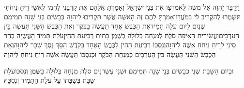\documentclass[../main/main.tex]{subfiles}
\begin{document}
\begin{multicols}{\ncols}
וַיְדַבֵּר יַהְוֶה אֶל מֹשֶׁה לֵּאמֹר\PreVerseSpace{}צַו אֶת בְּנֵי יִשְׂרָאֵל וְאָמַרְתָּ אֲלֵהֶם אֶת קָרְבָּנִי לַחְמִי לְאִשַּׁי רֵיחַ נִיחֹחִי תִּשְׁמְרוּ לְהַקְרִיב לִי בְּמֹעֲדָו\SubEnd{}\PreVerseSpace{}וְאָמַרְתָּ לָהֶם זֶה הָאִשֶּׁה אֲשֶׁר תַּקְרִיבוּ לַיהוָה כְּבָשִׂים בְּנֵי שָׁנָה תְמִימִם שְׁנַיִם לַיּוֹם עֹלָה תָמִיד\PreVerseSpace{}אֶת הַכֶּבֶשׂ אֶחָד תַּעֲשֶׂה בַבֹּקֶר וְאֵת הַכֶּבֶשׂ הַשֵּׁנִי תַּעֲשֶׂה בֵּין הָעַרְבָּיִם\PreVerseSpace{}וַעֲשִׂירִית הָאֵיפָה סֹלֶת לְמִנְחָה בְּלוּלָה בְּשֶׁמֶן כָּתִית רְבִיעִת הַהִין\PreVerseSpace{}עֹלַת תָּמִיד הָעֲשֻׂיָה בְּהַר סִינַי לְרֵיחַ נִיחֹחַ אִשֶּׁה לַיהוָה\PreVerseSpace{}וְנִסְכּוֹ רְבִיעִת הַהִין לַכֶּבֶשׂ הָאֶחָד בַּקֹּדֶשׁ הַסֵּךְ נֶסֶךְ שֵׁכָר לַיהוָה\PreVerseSpace{}וְאֵת הַכֶּבֶשׂ הַשֵּׁנִי תַּעֲשֶׂה בֵּין הָעַרְבָּיִם כְּמִנְחַת הַבֹּקֶר וּכְנִסְכּוֹ תַּעֲשֶׂה אִשֵּׁה רֵיחַ נִיחֹחַ לַיהוָה\OpenSection{}\par
{}וּבְיוֹם הַשַּׁבָּת שְׁנֵי כְבָשִׂים בְּנֵי שָׁנָה תְּמִימִם וּשְׁנֵי עֶשְׂרֹנִים סֹלֶת מִנְחָה בְּלוּלָה בַשֶּׁמֶן וְנִסְכּוֹ\PreVerseSpace{}עֹלַת שַׁבַּת בְּשַׁבַּתּוֹ עַל עֹלַת הַתָּמִיד וְנִסְכָּהּ\OpenSection{}\par

\end{multicols}
\end{document}
